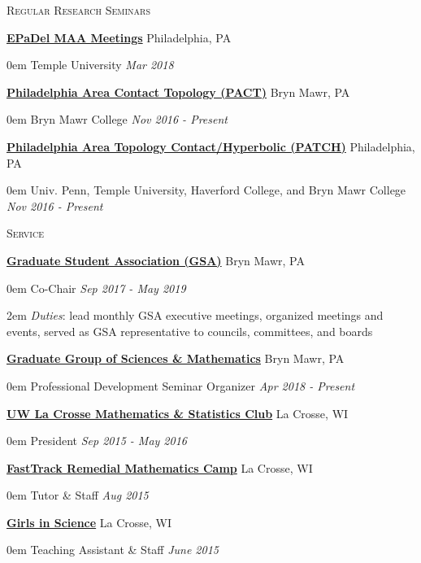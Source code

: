 \documentclass[11pt]{article}
\newenvironment{headitem}[2]{\vskip5pt \hspace{.5em} \textbf{#1} \hfill #2 \begin{addmargin}[0em]{0em}}{\end{addmargin}}
\renewenvironment{section}[1]{\textsc{\large #1}}{\vskip10pt}
\newcommand{\itemreg}[1]{\begin{addmargin}[.75em]{2em} #1 \end{addmargin}}
\newcommand{\itemdate}[2]{\hspace{.5em} #1 \hfill \textit{#2} \\}
\begin{document}
\begin{section}{Regular Research Seminars}
	
	\begin{headitem}{\href{http://sections.maa.org/epadel/}{EPaDel MAA Meetings}}{Philadelphia, PA}
		\itemdate{Temple University}{Mar 2018}
	\end{headitem}
	
	\begin{headitem}{\href{https://www.brynmawr.edu/math/pact-seminar}{Philadelphia Area Contact Topology (PACT)}}{Bryn Mawr, PA}
		\itemdate{Bryn Mawr College}{Nov 2016 - Present}
	\end{headitem}
	
	\begin{headitem}{\href{https://math.temple.edu/events/seminars/geometry/}{Philadelphia Area Topology Contact/Hyperbolic (PATCH)}}{Philadelphia, PA}
		\itemdate{Univ. Penn, Temple University, Haverford College, and Bryn Mawr College}{Nov 2016 - Present}
	\end{headitem}
	
\end{section}



\begin{section}{Service}

	\begin{headitem}{\href{https://www.brynmawr.edu/gsas/}{Graduate Student Association (GSA)}}{Bryn Mawr, PA}
		\itemdate{Co-Chair}{Sep 2017 - May 2019}
		\itemreg{\textit{Duties}: lead monthly GSA executive meetings, organized meetings and events, served as GSA representative to councils, committees, and boards}
	\end{headitem}
	
	\begin{headitem}{\href{https://www.brynmawr.edu/ggsm}{Graduate Group of Sciences \& Mathematics}}{Bryn Mawr, PA}
		\itemdate{Professional Development Seminar Organizer}{Apr 2018 - Present}
	\end{headitem}
	
	\begin{headitem}{\href{https://www.uwlax.edu/mathematics/activities/mathematics-and-stats-club/}{UW La Crosse Mathematics \& Statistics Club}}{La Crosse, WI}
		\itemdate{President}{Sep 2015 - May 2016}
	\end{headitem}
	
	\begin{headitem}{\href{https://www.uwlax.edu/mathematics/fasttrack/}{FastTrack Remedial Mathematics Camp}}{La Crosse, WI}
		\itemdate{Tutor \& Staff}{Aug 2015}
	\end{headitem}
	
	\begin{headitem}{\href{https://www.uwlax.edu/conted/youth-programs/girls-in-science/welcome/}{Girls in Science}}{La Crosse, WI}
		\itemdate{Teaching Assistant \& Staff}{June 2015}
	\end{headitem}
	
\end{section}
\end{document}
